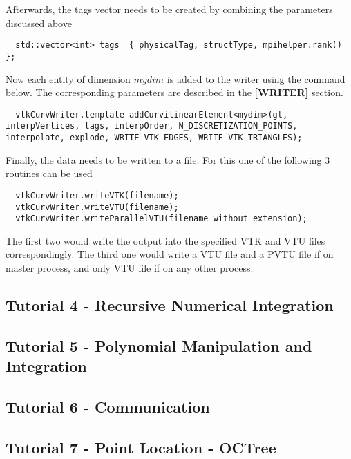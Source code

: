 \noindent
Afterwards, the tags vector needs to be created by combining the parameters discussed above

\begin{mybox}
\begin{lstlisting}
  std::vector<int> tags  { physicalTag, structType, mpihelper.rank() };
\end{lstlisting}
\end{mybox}

\noindent
Now each entity of dimension $mydim$ is added to the writer using the command below. The corresponding parameters are described in the \textbf{[WRITER]} section. \\

\begin{mybox}
\begin{lstlisting}
  vtkCurvWriter.template addCurvilinearElement<mydim>(gt, interpVertices, tags, interpOrder, N_DISCRETIZATION_POINTS, interpolate, explode, WRITE_VTK_EDGES, WRITE_VTK_TRIANGLES);
\end{lstlisting}
\end{mybox}

\noindent
Finally, the data needs to be written to a file. For this one of the following 3 routines can be used \\

\begin{mybox}
\begin{lstlisting}
  vtkCurvWriter.writeVTK(filename);
  vtkCurvWriter.writeVTU(filename);
  vtkCurvWriter.writeParallelVTU(filename_without_extension);
\end{lstlisting}
\end{mybox}

\noindent
The first two would write the output into the specified VTK and VTU files correspondingly. The third one would write a VTU file and a PVTU file if on master process, and only VTU file if on any other process.




\subsection{Tutorial 4 - Recursive Numerical Integration}
\label{usage-howto-tutorial-integration-recursive}

\subsection{Tutorial 5 - Polynomial Manipulation and Integration}
\label{usage-howto-tutorial-polynomial}

\subsection{Tutorial 6 - Communication}
\label{usage-howto-tutorial-communication}


\subsection{Tutorial 7 - Point Location - OCTree}
\label{usage-howto-tutorial-octree}










